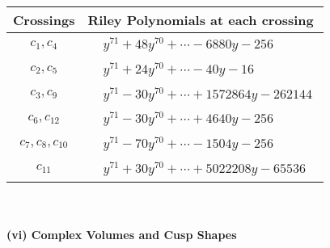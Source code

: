 \documentclass[1p]{elsarticle_modified}
\theoremstyle{definition}
\begin{document}
\begin{tabular}{m{50pt}|m{274pt}}
Crossings & \hspace{64pt}Riley Polynomials at each crossing \\
\hline $$\begin{aligned}c_{1},c_{4}\end{aligned}$$&$\begin{aligned}
&y^{71}+48 y^{70}+\cdots-6880 y-256
\end{aligned}$\\
\hline $$\begin{aligned}c_{2},c_{5}\end{aligned}$$&$\begin{aligned}
&y^{71}+24 y^{70}+\cdots-40 y-16
\end{aligned}$\\
\hline $$\begin{aligned}c_{3},c_{9}\end{aligned}$$&$\begin{aligned}
&y^{71}-30 y^{70}+\cdots+1572864 y-262144
\end{aligned}$\\
\hline $$\begin{aligned}c_{6},c_{12}\end{aligned}$$&$\begin{aligned}
&y^{71}-30 y^{70}+\cdots+4640 y-256
\end{aligned}$\\
\hline $$\begin{aligned}c_{7},c_{8},c_{10}\end{aligned}$$&$\begin{aligned}
&y^{71}-70 y^{70}+\cdots-1504 y-256
\end{aligned}$\\
\hline $$\begin{aligned}c_{11}\end{aligned}$$&$\begin{aligned}
&y^{71}+30 y^{70}+\cdots+5022208 y-65536
\end{aligned}$\\
\hline
\end{tabular}\\~\\
\newpage\flushleft \textbf{(vi) Complex Volumes and Cusp Shapes}
\end{document}
